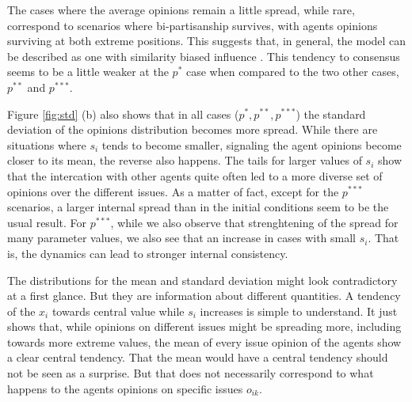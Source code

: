 \documentclass{article}
\begin{document}
{The cases where the average opinions remain a little spread, while rare,
correspond to scenarios where bi-partisanship survives, with agents opinions
surviving at both extreme positions. This suggests that, in general, the model
can be described as one with similarity biased influence \cite{flache2017}. This
tendency to consensus seems to be a little weaker at the \(p^*\) case when
compared to the two other cases, $p^{**}$ and $p^{***}$.


Figure \ref{fig:std} (b) also shows that in all cases (\(p^{*}, p^{**},
p^{***}\)) the standard deviation of the opinions distribution becomes more
spread. While there are situations where $s_i$ tends to become smaller,
signaling the agent opinions become closer to its mean, the reverse also
happens. The tails for larger values of $s_i$ show that the intercation with
other agents quite often led to a more diverse set of opinions over the
different issues. As a matter of fact, except for the $p^{***}$ scenarios, a
larger internal spread than in the initial conditions seem to be the usual
result. For $p^{***}$, while we also observe that strenghtening of the spread
for many parameter values, we also see that an increase in cases with small
$s_i$. That is, the dynamics can lead to stronger internal consistency.

The distributions for the mean and standard deviation might look contradictory
at a first glance. But they are information about different quantities. A
tendency of the $x_i$ towards central value while $s_i$ increases is simple to
understand. It just shows that, while opinions on different issues might be
spreading more, including towards more extreme values, the mean of every issue
opinion of the agents show a clear central tendency. That the mean would have a
central tendency should not be seen as a surprise. But that does not necessarily
correspond to what happens to the agents  opinions on specific issues $o_{ik}$.

}
\end{document}
